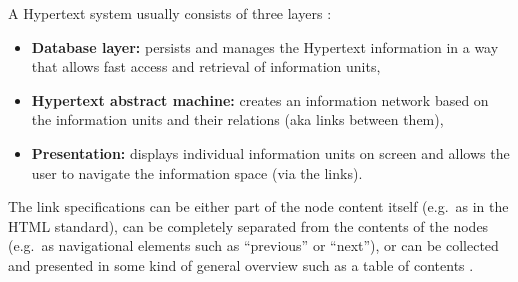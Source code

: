 A Hypertext system usually consists of three layers \citep[pg. 301-302]{borghoff2000computer}: \@

\begin{itemize}
  \item \textbf{Database layer:} persists and manages the Hypertext information in a way that allows fast access and retrieval of information units,
  \item \textbf{Hypertext abstract machine:} creates an information network based on the information units and their relations (aka links between them),
  \item \textbf{Presentation:} displays individual information units on screen and allows the user to navigate the information space (via the links).
\end{itemize}


The link specifications can be either part of the node content itself (e.g.\ as in the \gls{HTML} standard), can be completely separated from the contents of the nodes (e.g.\ as navigational elements such as ``previous'' or ``next''), or can be collected and presented in some kind of general overview such as a table of contents \citep[pg. 304-306]{borghoff2000computer}.


